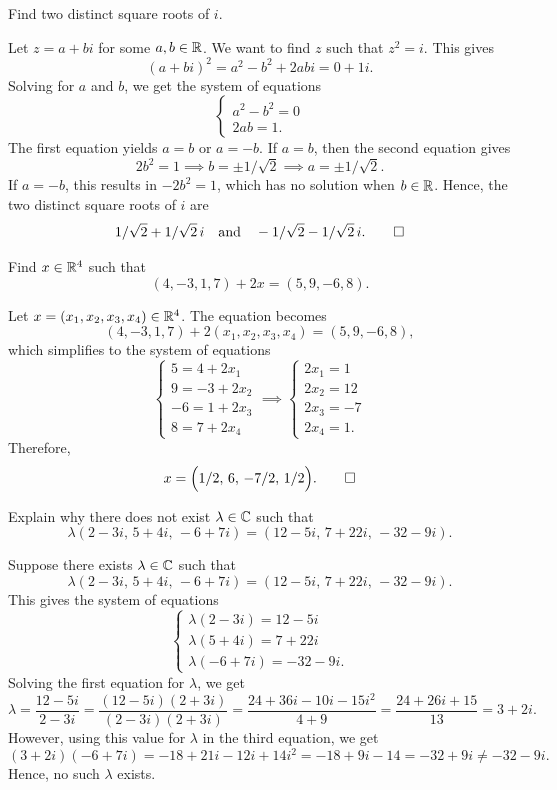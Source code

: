 \begin{exc}
\begin{exercise}
Find two distinct square roots of $i$.
\end{exercise}
\begin{solution}
Let $z=a+bi$ for some $a,b\in\mathbb{R}$. We want to find $z$ such that $z^2=i$. This
gives
\[ (a+bi)^2 = a^2-b^2+2abi = 0+1i. \]
Solving for $a$ and $b$, we get the system of equations
\[ \begin{cases} a^2-b^2=0\\ 2ab=1. \end{cases} \]
The first equation yields $a=b$ or $a=-b$. If $a=b$, then the second equation
gives
\[ 2b^2=1 \implies b=\pm1/\sqrt2 \implies a=\pm1/\sqrt2. \]
If $a=-b$, this results in $-2b^2=1$, which has no solution when $b\in\mathbb{R}$.
Hence, the two distinct square roots of $i$ are
\[ 1/\sqrt2+1/\sqrt2\,i \quad\text{and}\quad
   -1/\sqrt2-1/\sqrt2\,i. \qedhere \]
\end{solution}

\begin{exercise}
Find $x\in\mathbb{R}^4$ such that
\[ (4,-3,1,7)+2x=(5,9,-6,8). \]
\end{exercise}
\begin{solution}
Let $x=(x_1,x_2,x_3,x_4)\in\mathbb{R}^4$. The equation becomes
\[ (4,-3,1,7)+2(x_1,x_2,x_3,x_4)=(5,9,-6,8), \]
which simplifies to the system of equations
\[ \begin{cases} 5=4+2x_1\\ 9=-3+2x_2\\ -6=1+2x_3\\ 8=7+2x_4 \end{cases}
   \implies
   \begin{cases} 2x_1=1\\ 2x_2=12\\ 2x_3=-7\\ 2x_4=1. \end{cases} \]
Therefore,
\[ x=\Bigl(1/2,\,6,\,-7/2,\,1/2\Bigr). \qedhere \]
\end{solution}

\begin{exercise}
Explain why there does not exist $\lambda\in\mathbb{C}$ such that
\[ \lambda(2-3i,\,5+4i,\,-6+7i)=(12-5i,\,7+22i,\,-32-9i). \]
\end{exercise}
\begin{solution}
Suppose there exists $\lambda\in\mathbb{C}$ such that
\[ \lambda(2-3i,\,5+4i,\,-6+7i)=(12-5i,\,7+22i,\,-32-9i). \]
This gives the system of equations
\[ \begin{cases} \lambda(2-3i)=12-5i\\ \lambda(5+4i)=7+22i\\ \lambda(-6+7i)=-32-9i. \end{cases} \]
Solving the first equation for $\lambda$, we get
\[ \lambda=\frac{12-5i}{2-3i}=\frac{(12-5i)(2+3i)}{(2-3i)(2+3i)}
   =\frac{24+36i-10i-15i^2}{4+9}=\frac{24+26i+15}{13}=3+2i. \]
However, using this value for $\lambda$ in the third equation, we get
\[ (3+2i)(-6+7i)=-18+21i-12i+14i^2=-18+9i-14=-32+9i\ne-32-9i. \]
Hence, no such $\lambda$ exists.
\end{solution}


\end{exc}
